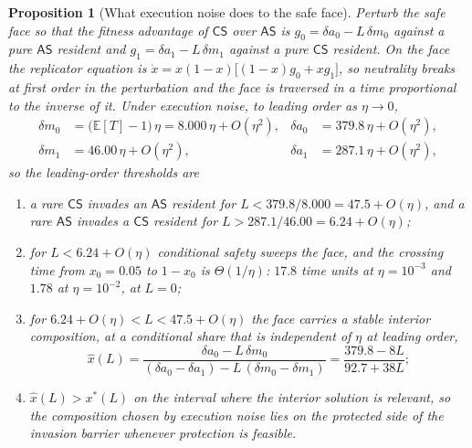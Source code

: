 \documentclass[11pt,a4paper]{article}
\newtheorem{proposition}[theorem]{Proposition}
\theoremstyle{definition}
\newcommand{\AS}{\textsf{AS}}
\newcommand{\CS}{\textsf{CS}}
\begin{document}
\begin{proposition}[What execution noise does to the safe face]\label{prop:rate}
Perturb the safe face so that the fitness advantage of $\CS$ over $\AS$ is
$g_{0}=\delta a_{0}-L\,\delta m_{0}$ against a pure $\AS$ resident and
$g_{1}=\delta a_{1}-L\,\delta m_{1}$ against a pure $\CS$ resident. On the
face the replicator equation is
$\dot x=x(1-x)\big[(1-x)g_{0}+xg_{1}\big]$, so neutrality breaks at first
order in the perturbation and the face is traversed in a time proportional to
the inverse of it. Under execution noise, to leading order as $\eta\to0$,
\begin{equation}
\begin{aligned}
\delta m_{0}&=\big(\mathbb{E}[T]-1\big)\,\eta=8.000\,\eta+O(\eta^2),
 &\delta a_{0}&=379.8\,\eta+O(\eta^2),\\
\delta m_{1}&=46.00\,\eta+O(\eta^2),
 &\delta a_{1}&=287.1\,\eta+O(\eta^2),
\end{aligned}
\label{eq:rate}
\end{equation}
so the leading-order thresholds are
\begin{enumerate}
\item[(i)] a rare $\CS$ invades an $\AS$ resident for
$L<379.8/8.000=47.5+O(\eta)$, and a rare $\AS$ invades a $\CS$ resident for
$L>287.1/46.00=6.24+O(\eta)$;
\item[(ii)] for $L<6.24+O(\eta)$ conditional safety sweeps the face, and the crossing
time from $x_{0}=0.05$ to $1-x_{0}$ is $\Theta(1/\eta)$: $17.8$ time units at
$\eta=10^{-3}$ and $1.78$ at $\eta=10^{-2}$, at $L=0$;
\item[(iii)] for $6.24+O(\eta)<L<47.5+O(\eta)$ the face carries a stable interior
composition, at a conditional share that is independent of $\eta$ at leading
order,
\begin{equation}
\hat x(L)=\frac{\delta a_{0}-L\,\delta m_{0}}
               {(\delta a_{0}-\delta a_{1})-L\,(\delta m_{0}-\delta m_{1})}
         =\frac{379.8-8L}{92.7+38L};
\label{eq:xhat}
\end{equation}
\item[(iv)] $\hat x(L)>x^{*}(L)$ on the interval where the interior solution is
relevant, so the composition chosen by execution noise lies on the protected
side of the invasion barrier whenever protection is feasible.
\end{enumerate}
\end{proposition}
\end{document}
